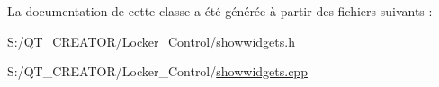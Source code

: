 La documentation de cette classe a été générée à partir des fichiers suivants \+:\begin{DoxyCompactItemize}
\item 
S\+:/\+Q\+T\+\_\+\+C\+R\+E\+A\+T\+O\+R/\+Locker\+\_\+\+Control/\hyperlink{showwidgets_8h}{showwidgets.\+h}\item 
S\+:/\+Q\+T\+\_\+\+C\+R\+E\+A\+T\+O\+R/\+Locker\+\_\+\+Control/\hyperlink{showwidgets_8cpp}{showwidgets.\+cpp}\end{DoxyCompactItemize}
